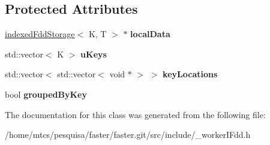 \subsection*{Protected Attributes}
\begin{DoxyCompactItemize}
\item 
\hypertarget{classfaster_1_1workerIFddCore_a6bd0d4cb57e817b78276c1442bc74441}{}\hyperlink{classfaster_1_1indexedFddStorage}{indexed\+Fdd\+Storage}$<$ K, T $>$ $\ast$ {\bfseries local\+Data}\label{classfaster_1_1workerIFddCore_a6bd0d4cb57e817b78276c1442bc74441}

\item 
\hypertarget{classfaster_1_1workerIFddCore_a2b45bf1e4561a0622ad33cc8ddab6618}{}std\+::vector$<$ K $>$ {\bfseries u\+Keys}\label{classfaster_1_1workerIFddCore_a2b45bf1e4561a0622ad33cc8ddab6618}

\item 
\hypertarget{classfaster_1_1workerIFddCore_a0aae335b6c84d8927e04a486f9957ad1}{}std\+::vector$<$ std\+::vector$<$ void $\ast$ $>$ $>$ {\bfseries key\+Locations}\label{classfaster_1_1workerIFddCore_a0aae335b6c84d8927e04a486f9957ad1}

\item 
\hypertarget{classfaster_1_1workerIFddCore_a6545ef59d553976a05da0c7790264fd1}{}bool {\bfseries grouped\+By\+Key}\label{classfaster_1_1workerIFddCore_a6545ef59d553976a05da0c7790264fd1}

\end{DoxyCompactItemize}


The documentation for this class was generated from the following file\+:\begin{DoxyCompactItemize}
\item 
/home/mtcs/pesquisa/faster/faster.\+git/src/include/\+\_\+worker\+I\+Fdd.\+h\end{DoxyCompactItemize}
